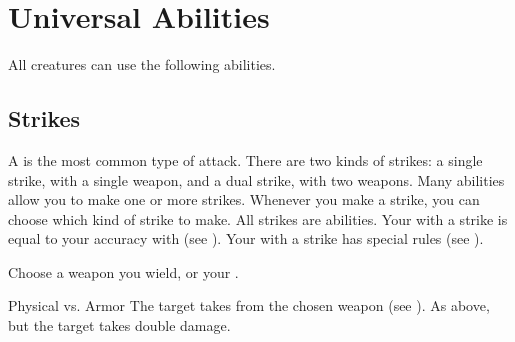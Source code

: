 \section{Universal Abilities}
    All creatures can use the following abilities.

    \subsection{Strikes}\label{Strikes}
        A  is the most common type of attack.
        There are two kinds of strikes: a single strike, with a single weapon, and a dual strike, with two weapons.
        Many abilities allow you to make one or more strikes.
        Whenever you make a strike, you can choose which kind of strike to make.
        All strikes are  abilities.
        Your  with a strike is equal to your accuracy with  (see ).
        Your  with a strike has special rules (see ).

        \begin{ability}
            \begin{spelltargetinginfo}
                \spellspecial Choose a weapon you wield, or your .
            \end{spelltargetinginfo}
            \begin{spelleffects}
                \begin{spellattack}{Physical vs. Armor}
                    \spellsuccess The target takes  from the chosen weapon (see ).
                    \spellcritical As above, but the target takes double damage.
                \end{spellattack}
            \end{spelleffects}
        \end{ability}

